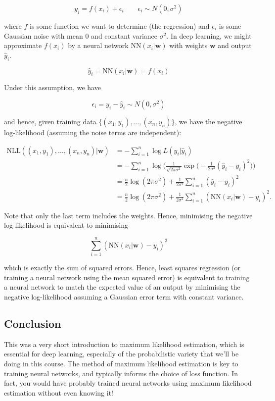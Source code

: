 \documentclass[11pt]{article}
\begin{document}
\[
y_i = f(x_i) + \epsilon_i \quad \quad  \epsilon_i \sim N(0, \sigma^2)
\]

where \(f\) is some function we want to determine (the regression) and
\(\epsilon_i\) is some Gaussian noise with mean 0 and constant variance
\(\sigma^2\). In deep learning, we might approximate \(f(x_i)\) by a
neural network \(\text{NN}(x_i | \mathbf{w})\) with weights
\(\mathbf{w}\) and output \(\hat{y}_i\).

\[
\hat{y}_i = \text{NN}(x_i | \mathbf{w}) = f(x_i)
\]

Under this assumption, we have

\[
\epsilon_i = y_i - \hat{y}_i \sim N(0, \sigma^2)
\]

and hence, given training data \(\{(x_1, y_1), \ldots, (x_n, y_n)\}\),
we have the negative log-likelihood (assuming the noise terms are
independent):

\[
\begin{align}
\text{NLL}((x_1, y_1), \ldots, (x_n, y_n) | \mathbf{w}) &= - \sum_{i=1}^n \log L(y_i | \hat{y}_i) \\
&= - \sum_{i=1}^n \log \Big( \frac{1}{\sqrt{2\pi\sigma^2}} \exp \Big( - \frac{1}{2\sigma^2} (\hat{y}_i - y_i)^2 \Big) \Big) \\
&= \frac{n}{2} \log (2\pi\sigma^2) + \frac{1}{2\sigma^2} \sum_{i=1}^n (\hat{y}_i - y_i)^2 \\
&= \frac{n}{2} \log (2\pi\sigma^2) + \frac{1}{2\sigma^2} \sum_{i=1}^n (\text{NN}(x_i | \mathbf{w}) - y_i)^2.
\end{align}
\]

Note that only the last term includes the weights. Hence, minimising the
negative log-likelihood is equivalent to minimising

\[
\sum_{i=1}^n (\text{NN}(x_i | \mathbf{w}) - y_i)^2
\]

which is exactly the sum of squared errors. Hence, least squares
regression (or training a neural network using the mean squared error)
is equivalent to training a neural network to match the expected value
of an output by minimising the negative log-likelihood assuming a
Gaussian error term with constant variance.

    \hypertarget{conclusion}{%
\subsection{Conclusion}\label{conclusion}}

This was a very short introduction to maximum likelihood estimation,
which is essential for deep learning, especially of the probabilistic
variety that we'll be doing in this course. The method of maximum
likelihood estimation is key to training neural networks, and typically
informs the choice of loss function. In fact, you would have probably
trained neural networks using maximum likelihood estimation without even
knowing it!
\end{document}
